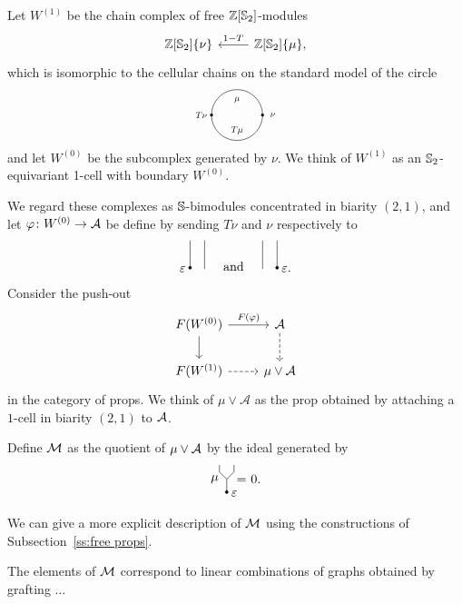 Let $W^{(1)}$ be the chain complex of free $\Z[\S_2]$-modules
\begin{equation*}
\begin{tikzcd}
\Z[\S_2]\{\nu\} &[0pt] \arrow[l, "1-T"'] \Z[\S_2]\{\mu\},
\end{tikzcd} 
\end{equation*}
which is isomorphic to the cellular chains on the standard model of the circle
\begin{equation*}
\begin{tikzpicture}
\draw (0,0) circle (20pt);
\node[scale=.7] at (0,12pt){$\mu$};
\node[scale=.7] at (0,-12pt){$T \mu$};
\node[scale=.7] at (-28pt,0){$T \nu$};
\node[scale=.7] at (28pt,0){$\nu$};
\draw [fill] (-20pt,0) circle [radius=1pt];
\draw [fill] (20pt,0) circle [radius=1pt];
\end{tikzpicture}
\end{equation*}
and let $W^{(0)}$ be the subcomplex generated by $\nu$. We think of $W^{(1)}$ as an $\S_2$-equivariant 1-cell with boundary $W^{(0)}$.

We regard these complexes as $\S$-bimodules concentrated in biarity $(2,1)$, and let $\varphi \colon W^{(0)} \to \A$ be define by sending $T \nu$ and $\nu$ respectively to
\begin{equation*}
	\begin{tikzpicture}[scale=.2]
	\draw (-4,0)--(-4,4);
	\draw (-6,0)--(-6,4);
	\draw [fill] (-6,.2) circle [radius=.2];
	\node [left] at (-6,0) {$\varepsilon$};
	
	\node at (0,.4) {and};
	
	\draw (4,0)--(4,4);
	\draw (6,0)--(6,4);
	\draw [fill] (6,.2) circle [radius=.2];
	\node [right] at (6,0) {$\varepsilon$.};
	\end{tikzpicture}
\end{equation*}
Consider the push-out
\begin{equation*}
\begin{tikzcd}
F(W^{(0)}) \arrow[r, "F(\varphi)"] \arrow[d] & \A \arrow[d, dashed] \\
F(W^{(1)}) \arrow[r, dashed] & \mu \vee \A
\end{tikzcd}
\end{equation*}
in the category of props. We think of $\mu \vee \mathcal A$ as the prop obtained by attaching a $1$-cell in biarity $(2,1)$ to $\A$.

Define $\M$ as the quotient of $\mu \vee \A$ by the ideal generated by
\begin{equation*}
\begin{tikzpicture}[scale=.2]
\draw (5,4)--(5,3)--(6,2)--(6,0);
\draw (7,4)--(7,3)--(6,2);
\node [left] at (5.5,2) {$\mu$};
\draw [fill] (6,.2) circle [radius=.2];
\node [right] at (6,0) {$\varepsilon$};

\node at (9,2) {= 0.};
\end{tikzpicture}
\end{equation*}

We can give a more explicit description of $\M$ using the constructions of Subsection~\ref{ss:free props}.

The elements of $\M$ correspond to linear combinations of graphs obtained by grafting ...